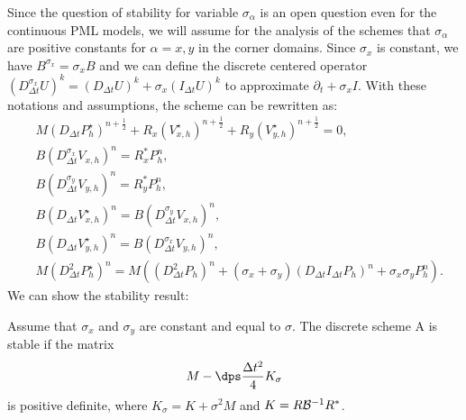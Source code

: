 \documentclass[a4paper]{article}
\def\Vs{V^{\star}}
\def\Ps{P^{\star}}
\begin{document}
Since the question of
stability for variable $\sigma_\alpha$ is an open question even for the
continuous PML models, we will assume for the analysis of the  schemes 
that $\sigma_\alpha$ are positive constants for $\alpha=x,y$ in the corner domains. 
Since $\sigma_x$ is constant, we have $B^{\sigma_x}= \sigma_x B$ and 
we can define the discrete centered operator 
$(D_{\Delta t}^{\sigma_x} U)^k=(D_{\Delta t} U)^k + \sigma_x (I_{\Delta t} {U})^k$
to approximate $\partial_t + \sigma_x I$. With these notations and
assumptions, the scheme can be rewritten as:
\begin{align}
&M(D_{\Delta t}\Ps_{h})^{n+\frac12}+R_{x}(\Vs_{x,h})^{n+\frac12}+R_{y}(\Vs_{y,h})^{n+\frac12}=0,\\
&B(D_{\Delta t}^{\sigma_x} V_{x,h})^{n}=R_{x}^{*}P_{h}^{n},\\
&B(D_{\Delta t}^{\sigma_y} V_{y,h})^{n}=R_{y}^{*}P_{h}^{n},\\
&B(D_{\Delta t}\Vs_{x,h})^{n}=B(D_{\Delta t}^{\sigma_y} V_{x,h})^n,\\
&B(D_{\Delta t}\Vs_{y,h})^{n}=B(D_{\Delta t}^{\sigma_x} V_{y,h})^n,\\
&M(D_{\Delta t}^{2}\Ps_{h})^{n}=M\left((D_{\Delta t}^2
P_{h})^{n}+(\sigma_x+\sigma_y) (D_{\Delta t} I_{\Delta t}
{P_{h}})^{n}+\sigma_x \sigma_y P_{h}^{n}\right).\label{eq:pml-sys-discr-A_6}
\end{align}
We can  show the stability result:
\begin{theo}\label{th:A}
Assume that  $\sigma_{x}$ and $\sigma_{y}$ are constant and equal to $\sigma$. 
The discrete scheme A is stable if the matrix
\begin{equation}\label{eq:cond_A}
M-\dps \frac{\Delta t^2}{4} K_\sigma 
\end{equation}
is positive definite, where $K_\sigma=K+\sigma^2 M$ 
and $K= R{\cal B}^{-1} R^{*}$.
\end{theo}
\end{document}
